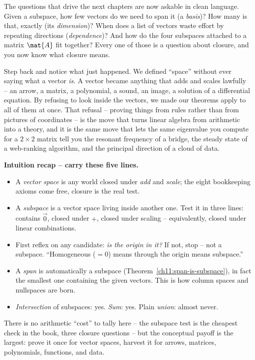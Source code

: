 The questions that drive the next chapters are now askable in clean language. Given a
subspace, how few vectors do we need to span it (a \emph{basis})? How many is that, exactly
(its \emph{dimension})? When does a list of vectors waste effort by repeating directions
(\emph{dependence})? And how do the four subspaces attached to a matrix $\mat{A}$ fit
together? Every one of those is a question about closure, and you now know what closure
means.

\begin{aestheticbox}
Step back and notice what just happened. We defined ``space'' without ever saying what a
vector \emph{is}. A vector became anything that adds and scales lawfully -- an arrow, a
matrix, a polynomial, a sound, an image, a solution of a differential equation. By
refusing to look inside the vectors, we made our theorems apply to all of them at once.
That refusal -- proving things from rules rather than from pictures of coordinates -- is
the move that turns linear algebra from arithmetic into a theory, and it is the same move
that lets the same eigenvalue you compute for a $2\times 2$ matrix tell you the resonant
frequency of a bridge, the steady state of a web-ranking algorithm, and the principal
direction of a cloud of data.
\end{aestheticbox}

\begin{recoverybox}
\textbf{Intuition recap -- carry these five lines.}
\begin{itemize}
  \item A \emph{vector space} is any world closed under \emph{add} and \emph{scale}; the
  eight bookkeeping axioms come free, closure is the real test.
  \item A \emph{subspace} is a vector space living inside another one. Test it in three
  lines: contains $\vec{0}$, closed under $+$, closed under scaling -- equivalently, closed
  under linear combinations.
  \item First reflex on any candidate: \emph{is the origin in it?} If not, stop -- not a
  subspace. ``Homogeneous ($=0$) means through the origin means subspace.''
  \item A \emph{span} is automatically a subspace (Theorem~\ref{ch11:span-is-subspace}), in
  fact the smallest one containing the given vectors. This is how column spaces and
  nullspaces are born.
  \item \emph{Intersection} of subspaces: yes. \emph{Sum}: yes. Plain \emph{union}:
  almost never.
\end{itemize}
There is no arithmetic ``cost'' to tally here -- the subspace test is the cheapest check in
the book, three closure questions -- but the conceptual payoff is the largest: prove it
once for vector spaces, harvest it for arrows, matrices, polynomials, functions, and data.
\end{recoverybox}

